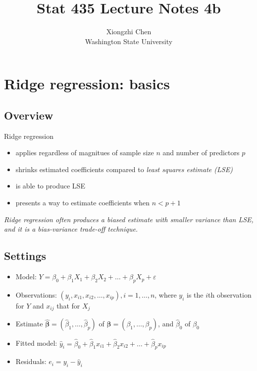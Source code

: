 \documentclass[]{article}
\title{Stat 435 Lecture Notes 4b}
\author{Xiongzhi Chen \\ Washington State University}
\date{}
\providecommand{\tightlist}{%
  \setlength{\itemsep}{0pt}\setlength{\parskip}{0pt}}
\begin{document}
\maketitle

{
\setcounter{tocdepth}{2}
\tableofcontents
}
\section{}\label{section}

\section{Ridge regression: basics}\label{ridge-regression-basics}

\subsection{Overview}\label{overview}

Ridge regression

\begin{itemize}
\tightlist
\item
  applies regardless of magnitues of sample size \(n\) and number of
  predictors \(p\)
\item
  shrinks estimated coefficients compared to \emph{least squares
  estimate (LSE)}
\item
  is able to produce LSE
\item
  presents a way to estimate coefficients when \(n < p+1\)
\end{itemize}

\emph{Ridge regression often produces a biased estimate with smaller
variance than LSE, and it is a bias-variance trade-off technique.}

\subsection{Settings}\label{settings}

\begin{itemize}
\item
  Model:
  \(Y=\beta_0+\beta_1 X_1 + \beta_2 X_2 + \ldots + \beta_p X_p + \varepsilon\)
\item
  Observations: \((y_i,x_{i1},x_{i2},\ldots,x_{ip}),i=1,\ldots,n\),
  where \(y_i\) is the \(i\)th observation for \(Y\) and \(x_{ij}\) that
  for \(X_j\)
\item
  Estimate
  \(\hat{\boldsymbol{\beta}}=(\hat{\beta}_1,\ldots,\hat{\beta}_p)\) of
  \({\boldsymbol{\beta}}=({\beta}_1,\ldots,{\beta}_p)\), and
  \(\hat{\beta}_0\) of \({\beta}_0\)
\item
  Fitted model:
  \(\hat{y}_i=\hat{\beta}_0+\hat{\beta}_1 x_{i1} + \hat{\beta}_2 x_{i2} + \ldots + \hat{\beta}_p x_{ip}\)
\item
  Residuals: \(e_i=y_i - \hat{y}_i\)
\end{itemize}
\end{document}
